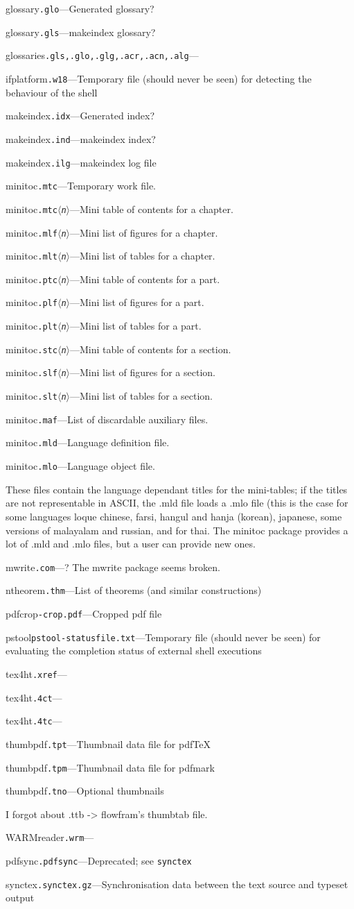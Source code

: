 \documentclass{article}
\newcommand\ext[1]{\texttt{#1}}
\newcommand\EXT[3]{\noindent #1\quad\ext{#2}\quad---\quad#3\par}
\def\<#1>{$\langle$\textit{\rmfamily n}$\rangle$}
\begin{document}
\EXT{glossary}{.glo}{Generated glossary?}
\EXT{glossary}{.gls}{makeindex glossary?}
\EXT{glossaries}{.gls,.glo,.glg,.acr,.acn,.alg}{}

\EXT{ifplatform}{.w18}{Temporary file (should never be seen) for detecting the behaviour of the shell}

\EXT{makeindex}{.idx}{Generated index?}
\EXT{makeindex}{.ind}{makeindex index?}
\EXT{makeindex}{.ilg}{makeindex log file}

\EXT{minitoc}{.mtc}{Temporary work file.}
\EXT{minitoc}{.mtc\<n>}{Mini table of contents for a chapter.}
\EXT{minitoc}{.mlf\<n>}{Mini list of figures for a chapter.}
\EXT{minitoc}{.mlt\<n>}{Mini list of tables for a chapter.}
\EXT{minitoc}{.ptc\<n>}{Mini table of contents for a part.}
\EXT{minitoc}{.plf\<n>}{Mini list of figures for a part.}
\EXT{minitoc}{.plt\<n>}{Mini list of tables for a part.}
\EXT{minitoc}{.stc\<n>}{Mini table of contents for a section.}
\EXT{minitoc}{.slf\<n>}{Mini list of figures for a section.}
\EXT{minitoc}{.slt\<n>}{Mini list of tables for a section.}
\EXT{minitoc}{.maf}{List of discardable auxiliary files.}
\EXT{minitoc}{.mld}{Language definition file.}
\EXT{minitoc}{.mlo}{Language object file.}

These files contain the language dependant titles for the
mini-tables; if the titles are not representable in ASCII,
the .mld file loads a .mlo file (this is the case for some
languages loque chinese, farsi, hangul and hanja (korean),
japanese, some versions of malayalam and russian, and for
thai. The minitoc package provides a lot of .mld and .mlo
files, but a user can provide new ones.

\EXT{mwrite}{.com}{? The mwrite package seems broken.}
\EXT{ntheorem}{.thm}{List of theorems (and similar constructions)}

\EXT{pdfcrop}{-crop.pdf}{Cropped pdf file}

\EXT{pstool}{pstool-statusfile.txt}{Temporary file (should never be seen) for evaluating the completion status of external shell executions}

\EXT{tex4ht}{.xref}{}
\EXT{tex4ht}{.4ct}{}
\EXT{tex4ht}{.4tc}{}

\EXT{thumbpdf}{.tpt}{Thumbnail data file for pdfTeX}
\EXT{thumbpdf}{.tpm}{Thumbnail data file for pdfmark}
\EXT{thumbpdf}{.tno}{Optional thumbnails}
I forgot about \jobname.ttb -> flowfram's thumbtab file.

\EXT{WARMreader}{.wrm}{}

\EXT{pdfsync}{.pdfsync}{Deprecated; see \ext{synctex}}
\EXT{synctex}{.synctex.gz}{Synchronisation data between the text source and typeset output}
\end{document}
